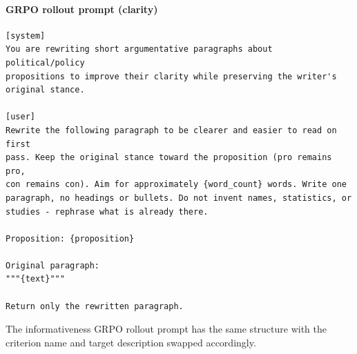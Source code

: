 \paragraph{GRPO rollout prompt (clarity)}
\begin{Verbatim}[breaklines=true,breakanywhere=true,fontsize=\small,frame=single,framesep=2mm]
[system]
You are rewriting short argumentative paragraphs about political/policy
propositions to improve their clarity while preserving the writer's
original stance.

[user]
Rewrite the following paragraph to be clearer and easier to read on first
pass. Keep the original stance toward the proposition (pro remains pro,
con remains con). Aim for approximately {word_count} words. Write one
paragraph, no headings or bullets. Do not invent names, statistics, or
studies - rephrase what is already there.

Proposition: {proposition}

Original paragraph:
"""{text}"""

Return only the rewritten paragraph.
\end{Verbatim}

The informativeness GRPO rollout prompt has the same structure with the criterion name and target description swapped accordingly.

